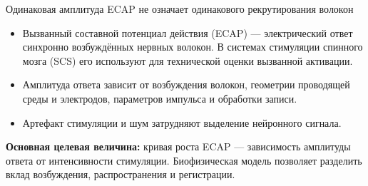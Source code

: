 \begin{frame}{Одинаковая амплитуда ECAP не означает одинакового рекрутирования волокон}
\begin{itemize}
\item Вызванный составной потенциал действия (ECAP) --- электрический ответ синхронно возбуждённых нервных волокон. В системах стимуляции спинного мозга (SCS) его используют для технической оценки вызванной активации.
\item Амплитуда ответа зависит от возбуждения волокон, геометрии проводящей среды и электродов, параметров импульса и обработки записи.
\item Артефакт стимуляции и шум затрудняют выделение нейронного сигнала.
\end{itemize}
\SlideGap
\textbf{Основная целевая величина:} кривая роста ECAP --- зависимость амплитуды ответа от интенсивности стимуляции. Биофизическая модель позволяет разделить вклад возбуждения, распространения и регистрации.
\end{frame}
